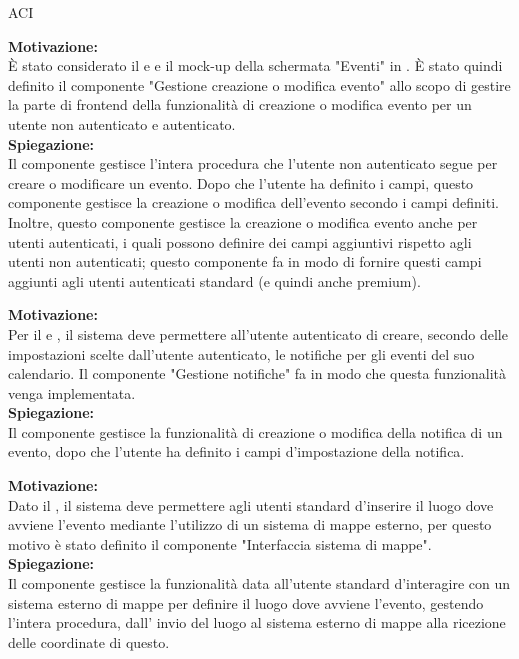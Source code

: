 \begin{listaPersonale}{ACI}

    \textbf{Motivazione:}\\
    È stato considerato il  e  e il mock-up della schermata "Eventi" in .
    È stato quindi definito il componente "Gestione creazione o modifica evento" allo scopo di gestire la parte di frontend della funzionalità di creazione o modifica evento per un utente non autenticato e autenticato. \\
    \textbf{Spiegazione:}\\
    Il componente gestisce l'intera procedura che l'utente non autenticato segue per creare o modificare un evento. Dopo che l'utente ha definito i campi, questo componente gestisce la creazione o modifica dell'evento secondo i campi definiti. Inoltre, questo componente gestisce la creazione o modifica evento anche per utenti autenticati, i quali possono definire dei campi aggiuntivi rispetto agli utenti non autenticati; questo componente fa in modo di fornire questi campi aggiunti agli utenti autenticati standard (e quindi anche premium).


    \textbf{Motivazione:}\\
    Per il  e , il sistema deve permettere all'utente autenticato di creare, secondo delle impostazioni scelte dall'utente autenticato, le notifiche per gli eventi del suo calendario. Il componente "Gestione notifiche" fa in modo che questa funzionalità venga implementata. \\
    \textbf{Spiegazione:} \\Il componente gestisce la funzionalità di creazione o modifica della notifica di un evento, dopo che l'utente ha definito i campi d'impostazione della notifica.


    \textbf{Motivazione:}\\
    Dato il , il sistema deve permettere agli utenti standard d'inserire il luogo dove avviene l'evento mediante l'utilizzo di un sistema di mappe esterno, per questo motivo è stato definito il componente "Interfaccia sistema di mappe". \\
    \textbf{Spiegazione:} \\Il componente gestisce la funzionalità data all'utente standard d'interagire con un sistema esterno di mappe per definire il luogo dove avviene l'evento, gestendo l'intera procedura, dall' invio del luogo al sistema esterno di mappe alla ricezione delle coordinate di questo.



\end{listaPersonale}
